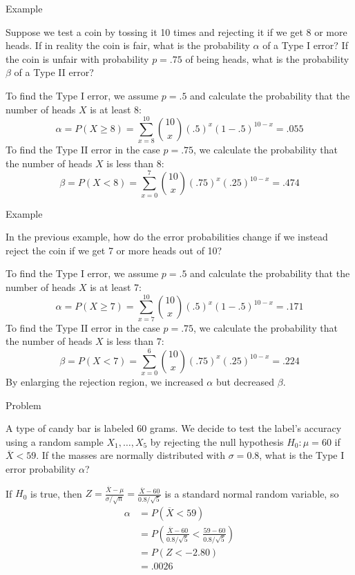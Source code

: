 \documentclass[handout]{beamer}
\begin{document}
\begin{frame}{Example}
\begin{block}{}
Suppose we test a coin by tossing it 10 times and rejecting it if we get 8 or more heads. If in reality the coin is fair, what is the probability $\alpha$ of a Type I error? If the coin is unfair with probability $p=.75$ of being heads, what is the probability $\beta$ of a Type II error?
\end{block}
\pause To find the Type I error, we assume $p=.5$ and calculate the probability that the number of heads $X$ is at least 8:
\pause $$\alpha = P(X \geq 8) = \sum_{x=8}^{10} \binom{10} x (.5)^x(1-.5)^{10-x}= .055$$
\pause To find the Type II error in the case $p=.75$, we calculate the probability that the number of heads $X$ is less than 8:
\pause $$\beta = P(X < 8) = \sum_{x=0}^7 \binom{10} x (.75)^x(.25)^{10-x} = .474$$
\end{frame}

\begin{frame}{Example}
\begin{block}{}
In the previous example, how do the error probabilities change if we instead reject the coin if we get 7 or more heads out of 10?
\end{block}
\pause To find the Type I error, we assume $p=.5$ and calculate the probability that the number of heads $X$ is at least 7:
\pause $$\alpha = P(X \geq 7) = \sum_{x=7}^{10} \binom{10} x (.5)^x(1-.5)^{10-x}= .171$$
\pause To find the Type II error in the case $p=.75$, we calculate the probability that the number of heads $X$ is less than 7:
\pause $$\beta = P(X < 7) = \sum_{x=0}^6 \binom{10} x (.75)^x(.25)^{10-x} = .224$$
By enlarging the rejection region, we increased $\alpha$ but decreased $\beta$.
\end{frame}

\begin{frame}{Problem}
\begin{block}{}
A type of candy bar is labeled 60 grams. We decide to test the label's accuracy using a random sample $X_1,\dots,X_5$ by rejecting the null hypothesis $H_0: \mu=60$ if $\overline X<59$. If the masses are normally distributed with $\sigma=0.8$, what is the Type I error probability $\alpha$?
\end{block}

\pause If $H_0$ is true, then $Z=\frac{\overline X-\mu}{\sigma/\sqrt{n}}=\frac{\overline X-60}{0.8/\sqrt5}$ is a standard normal random variable, \pause so
\begin{align*}
\alpha &= P(\overline X<59) \\
&= P\left(\frac{\overline X-60}{0.8/\sqrt5} < \frac{59-60}{0.8/\sqrt5}\right)\\
&= P(Z < -2.80) \\
&= .0026
\end{align*}
\end{frame}
\end{document}
